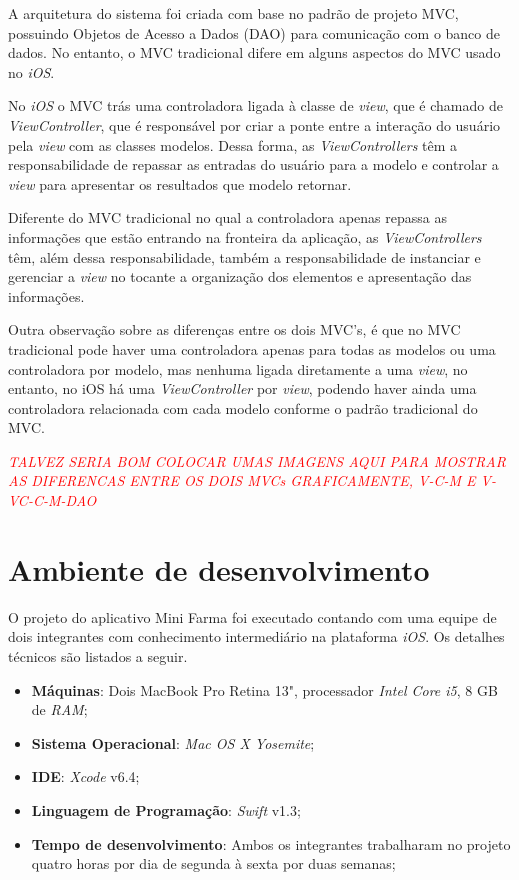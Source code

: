 A arquitetura do sistema foi criada com base no padrão de projeto MVC, possuindo Objetos de Acesso a Dados (DAO) para comunicação 
com o banco de dados. No entanto, o MVC tradicional difere em alguns aspectos do MVC usado no \textit{iOS}. 

No \textit{iOS} o MVC trás uma controladora ligada à classe de \textit{view}, que é chamado de \textit{ViewController}, que é responsável por 
criar a ponte entre a interação do usuário pela \textit{view} com as classes modelos. Dessa forma, as \textit{ViewControllers} têm a 
responsabilidade de repassar as entradas do usuário para a modelo e controlar a \textit{view} para apresentar os resultados que modelo retornar.


Diferente do MVC tradicional no qual a controladora apenas repassa as informações que estão entrando na fronteira da aplicação, 
as \textit{ViewControllers} têm, além dessa responsabilidade, também a responsabilidade de instanciar e gerenciar a \textit{view} no tocante
a organização dos elementos e apresentação das informações.


Outra observação sobre as diferenças entre os dois MVC's, é que no MVC tradicional pode haver uma controladora apenas 
para todas as modelos ou uma controladora por modelo, mas nenhuma ligada diretamente a uma \textit{view}, no entanto, no iOS há uma 
\textit{ViewController} por \textit{view}, podendo haver ainda uma controladora relacionada com cada modelo conforme o padrão tradicional do MVC.

\textcolor{red}{\textit{TALVEZ SERIA BOM COLOCAR UMAS IMAGENS AQUI PARA MOSTRAR AS DIFERENCAS ENTRE OS DOIS MVCs GRAFICAMENTE, V-C-M E V-VC-C-M-DAO}}

\section{Ambiente de desenvolvimento} \label{subsec:ambientedesenvolvimento}

O projeto do aplicativo Mini Farma foi executado contando com uma equipe de dois integrantes com 
conhecimento intermediário na plataforma \textit{iOS}. Os detalhes técnicos são listados a seguir.
\begin{itemize}
    \item \textbf{Máquinas}: Dois MacBook Pro Retina 13", processador \textit{Intel Core i5}, 8 GB de \textit{RAM};
    \item \textbf{Sistema Operacional}: \textit{Mac OS X Yosemite};
    \item \textbf{IDE}: \textit{Xcode} v6.4;
    \item \textbf{Linguagem de Programação}: \textit{Swift} v1.3;
    \item \textbf{Tempo de desenvolvimento}: Ambos os integrantes trabalharam no projeto quatro horas por dia de segunda à sexta por duas semanas;
\end{itemize}

